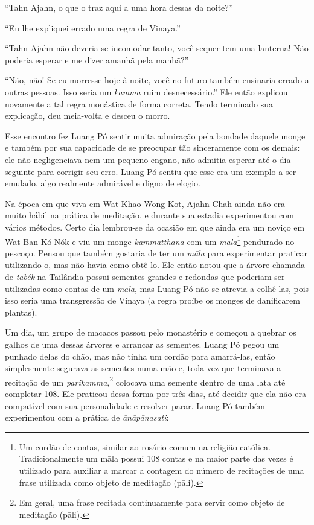 ``Tahn Ajahn, o que o traz aqui a uma hora dessas da noite?''

``Eu lhe expliquei errado uma regra de Vinaya.''

``Tahn Ajahn não deveria se incomodar tanto, você sequer tem uma
lanterna! Não poderia esperar e me dizer amanhã pela manhã?''

``Não, não! Se eu morresse hoje à noite, você no futuro também ensinaria
errado a outras pessoas. Isso seria um \emph{kamma} ruim
desnecessário.'' Ele então explicou novamente a tal regra monástica de
forma correta. Tendo terminado sua explicação, deu meia-volta e desceu o
morro.

Esse encontro fez Luang Pó sentir muita admiração pela bondade daquele
monge e também por sua capacidade de se preocupar tão sinceramente com
os demais: ele não negligenciava nem um pequeno engano, não admitia
esperar até o dia seguinte para corrigir seu erro. Luang Pó sentiu que
esse era um exemplo a ser emulado, algo realmente admirável e digno de
elogio.

Na época em que viva em Wat Khao Wong Kot, Ajahn Chah ainda não era
muito hábil na prática de meditação, e durante sua estadia experimentou
com vários métodos. Certo dia lembrou-se da ocasião em que ainda era um
noviço em Wat Ban Kó Nók e viu um monge \emph{kammatthāna} com um
\emph{māla}\footnote{Um cordão de contas, similar ao rosário comum na
  religião católica. Tradicionalmente um māla possui 108 contas e na
  maior parte das vezes é utilizado para auxiliar a marcar a contagem do
  número de recitações de uma frase utilizada como objeto de meditação
  (pāli).} pendurado no pescoço. Pensou que também gostaria de ter um
\emph{māla} para experimentar praticar utilizando-o, mas não havia como
obtê-lo. Ele então notou que a árvore chamada de \emph{tabék} na
Tailândia possui sementes grandes e redondas que poderiam ser utilizadas
como contas de um \emph{māla}, mas Luang Pó não se atrevia a colhê-las,
pois isso seria uma transgressão de Vinaya (a regra proíbe os monges de
danificarem plantas).

Um dia, um grupo de macacos passou pelo monastério e começou a quebrar
os galhos de uma dessas árvores e arrancar as sementes. Luang Pó pegou
um punhado delas do chão, mas não tinha um cordão para amarrá-las, então
simplesmente segurava as sementes numa mão e, toda vez que terminava a
recitação de um \emph{parikamma},\footnote{Em geral, uma frase recitada
  continuamente para servir como objeto de meditação (pāli).}
colocava uma semente dentro de uma lata até completar 108. Ele praticou
dessa forma por três dias, até decidir que ela não era compatível com
sua personalidade e resolver parar. Luang Pó também experimentou com a
prática de \emph{ānāpānasati}:

